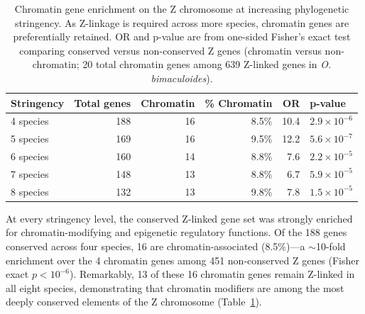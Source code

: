 \documentclass[12pt]{article}
\begin{document}
\begin{table}[tbp]
\centering
\caption{Chromatin gene enrichment on the Z chromosome at increasing phylogenetic stringency.
As Z-linkage is required across more species, chromatin genes are preferentially retained.
OR and p-value are from one-sided Fisher's exact test comparing
conserved versus non-conserved Z genes (chromatin versus non-chromatin;
20 total chromatin genes among 639 Z-linked genes in \textit{O. bimaculoides}).}
\label{tab:z_enrichment}
\begin{tabular}{lrrrrl}
\toprule
\textbf{Stringency} & \textbf{Total genes} & \textbf{Chromatin} & \textbf{\% Chromatin} & \textbf{OR} & \textbf{p-value} \\
\midrule
4 species & 188 & 16 & 8.5\% & 10.4 & $2.9 \times 10^{-6}$ \\
5 species & 169 & 16 & 9.5\% & 12.2 & $5.6 \times 10^{-7}$ \\
6 species & 160 & 14 & 8.8\% & 7.6 & $2.2 \times 10^{-5}$ \\
7 species & 148 & 13 & 8.8\% & 6.7 & $5.9 \times 10^{-5}$ \\
8 species & 132 & 13 & 9.8\% & 7.8 & $1.5 \times 10^{-5}$ \\
\bottomrule
\end{tabular}
\end{table}

At every stringency level, the conserved Z-linked gene set
was strongly enriched for chromatin-modifying and epigenetic regulatory functions.
Of the 188 genes conserved across four species,
16 are chromatin-associated (8.5\%)---a $\sim$10-fold enrichment
over the 4 chromatin genes among 451 non-conserved Z genes
(Fisher exact $p < 10^{-6}$).
Remarkably, 13 of these 16 chromatin genes remain Z-linked in all eight species,
demonstrating that chromatin modifiers are among the most deeply conserved
elements of the Z chromosome
(Table~\ref{tab:z_enrichment}).
\end{document}
